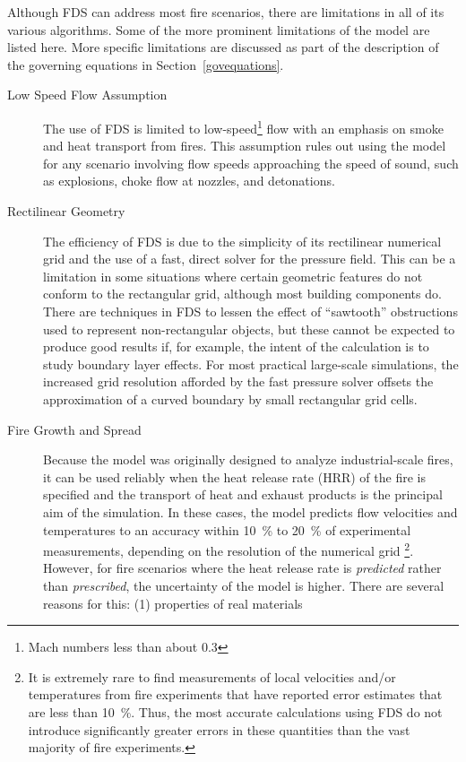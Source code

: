 \documentclass[11pt]{book}
\begin{document}
Although FDS can address most fire scenarios, there are limitations in all of its various
algorithms. Some of the more prominent limitations of the model are listed here. More
specific limitations are discussed as part of the description of the governing equations
in Section~\ref{govequations}.
\begin{description}
\item[Low Speed Flow Assumption] The use of FDS is limited to low-speed\footnote{Mach numbers less than about 0.3} flow
with an emphasis on smoke and heat transport from fires. This assumption rules out using the model for any scenario
involving flow speeds approaching the speed of sound, such as explosions, choke flow at nozzles, and detonations.
\item[Rectilinear Geometry] The efficiency of FDS is due to the simplicity of its rectilinear numerical grid and the
use of a fast, direct solver for the pressure field.
This can be a limitation in some situations where certain geometric features
do not conform to the rectangular grid, although most building components do. There are techniques in FDS to
lessen the effect of ``sawtooth'' obstructions used to represent non-rectangular objects, but these cannot be expected
to produce good results if, for example, the intent of the calculation is to study boundary layer effects. For most
practical large-scale simulations, the increased grid resolution afforded by the fast pressure solver offsets the
approximation of a curved boundary by small rectangular grid cells.
\item[Fire Growth and Spread]
Because the model was originally designed to analyze industrial-scale fires,
it can be used reliably when the heat release rate (HRR) of the fire is specified and the
transport of heat and exhaust products is the principal aim of the simulation.
In these cases, the model predicts flow velocities and temperatures to an accuracy within
10~\% to 20~\% of experimental measurements, depending on the resolution of the numerical grid
\footnote{It is extremely rare to
find measurements of local velocities and/or temperatures from fire experiments that
have reported error estimates that are less than 10~\%. Thus, the most accurate
calculations using FDS do not introduce significantly greater errors in these quantities
than the vast majority of fire experiments.}.
However, for fire scenarios where the heat release rate is {\em predicted} rather than {\em prescribed},
the uncertainty of the model is higher.
There are several reasons for this: (1) properties of real materials

\end{description}
\end{document}
